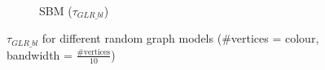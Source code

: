 \begin{figure}
\begin{subfigure}{0.3\columnwidth}
    \caption{SBM ($\tau_{GLR\_bl}$)}%
    \label{tau_GLR_bl_SBM}%
    \end{subfigure}%
    \caption{$\tau_{GLR\_bl}$ for different random graph models (\#vertices = colour, bandwidth = $\frac{\text{\# vertices}}{10}$)}
\label{GLR_Threshold_plots_bl}
\end{figure}


